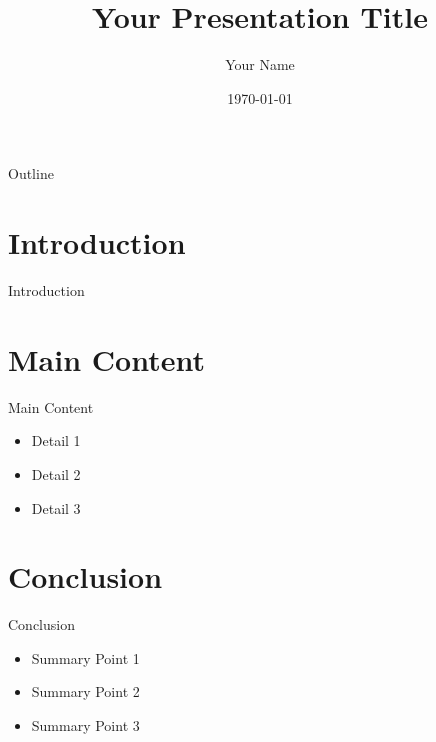 \documentclass{beamer}
\title{Your Presentation Title}
\author{Your Name}
\date{\today}
\begin{document}
\begin{frame}
    \titlepage
\end{frame}

\begin{frame}{Outline}
    \tableofcontents
\end{frame}

\section{Introduction}
\begin{frame}{Introduction}
    
\end{frame}

\section{Main Content}
\begin{frame}{Main Content}
    \begin{itemize}
        \item Detail 1
        \item Detail 2
        \item Detail 3
    \end{itemize}
\end{frame}

\section{Conclusion}
\begin{frame}{Conclusion}
    \begin{itemize}
        \item Summary Point 1
        \item Summary Point 2
        \item Summary Point 3
    \end{itemize}
\end{frame}
\end{document}
